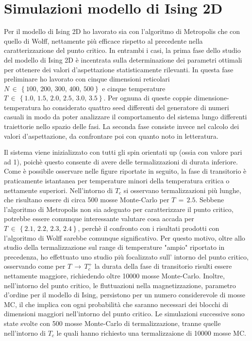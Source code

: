 \section{Simulazioni modello di Ising 2D}

Per il modello di Ising 2D ho lavorato sia con l'algoritmo di Metropolis che con quello di Wolff, nettamente più efficace rispetto al 
precedente nella caratterizzazione del punto critico. In entrambi i casi, la prima fase dello studio del modello di Ising 2D è incentrata 
sulla determinazione dei parametri ottimali per ottenere dei valori d'aspettazione statisticamente rilevanti.
In questa fase preliminare ho lavorato con cinque dimensioni reticolari $N\,\in\,\left\{100,\,200,\,300,\,400,\,500\right\}$ e 
cinque temperature $T\,\in\,\left\{1.0,\,1.5,\,2.0,\,2.5,\,3.0,\,3.5\right\}$. Per ognuna di queste coppie dimensione-temperatura 
ho considerato quattro seed differenti del generatore di numeri casuali in modo da poter analizzare il comportamento del sistema 
lungo differenti traiettorie nello spazio delle fasi. La seconda fase consiste invece nel calcolo dei valori d'aspettazione, da confrontare 
poi con quanto noto in letteratura.







Il sistema viene inizializzato con tutti gli spin orientati up (ossia con valore pari ad 1), poichè questo consente di avere delle 
termalizzazioni di durata inferiore. Come è possibile osservare nelle figure riportate in seguito, la fase di transitorio è praticamente 
istantanea per temperature minori della temperatura critica o nettamente superiori. Nell'intorno di $T_c$ si osservano termalizzazioni 
più lunghe, che risultano essere di circa 500 mosse Monte-Carlo per $T\,=\,2.5$. Sebbene l'algoritmo di Metropolis non sia adeguato 
per caratterizzare il punto critico, potrebbe essere comunque interessante valutare cosa accada per $T\,\in\,\left\{2.1,\,2.2,\,2.3,\,2.4\right\}$, 
perchè il confronto con i risultati prodotti con l'algoritmo di Wolff sarebbe comunque significativo. Per questo motivo, oltre allo 
studio della termalizzazione sul range di temperature "ampio" riportato in precedenza, ho effettuato uno studio più focalizzato sull'
intorno del punto critico, osservando come per $T\,\to\,T_c^+$ la durata della fase di transitorio risulti essere nettamente maggiore, 
richiedendo oltre 10000 mosse Monte-Carlo. Inoltre, nell'intorno del punto critico, le fluttuazioni nella magnetizzazione, parametro 
d'ordine per il modello di Ising, persistono per un numero considerevole di mosse MC, il che implica con ogni probabilità che saranno 
necessari dei blocchi di dimensioni maggiori nell'intorno del punto critico. Le simulazioni successive sono state svolte con 500 mosse 
Monte-Carlo di termalizzazione, tranne quelle nell'intorno di $T_c$ le quali hanno richiesto una termalizzaione di 10000 mosse MC.
